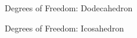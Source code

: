 \documentclass{beamer}
\begin{document}
\begin{frame}{Degrees of Freedom: Dodecahedron}
  \centering
{}
\end{frame}
\begin{frame}{Degrees of Freedom: Icosahedron}
  \centering
{}
\end{frame}
\end{document}

